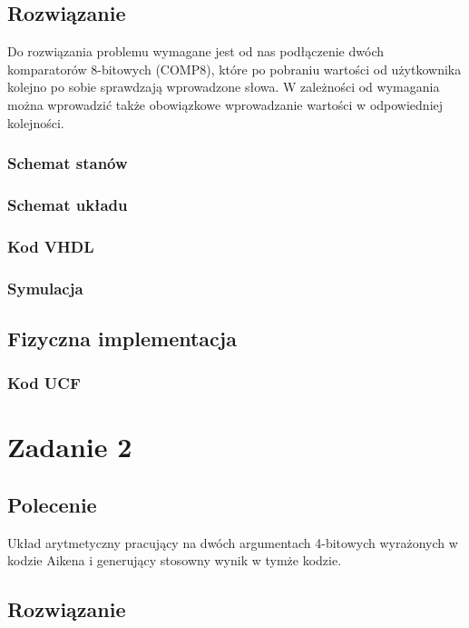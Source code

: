 \documentclass[a4paper,12pt]{extarticle}  %
\begin{document}
\subsection{Rozwiązanie}
Do rozwiązania problemu wymagane jest od nas podłączenie dwóch komparatorów 8-bitowych (COMP8), 
które po pobraniu wartości od użytkownika kolejno po sobie sprawdzają wprowadzone słowa.
W zależności od wymagania można wprowadzić także obowiązkowe wprowadzanie wartości w odpowiedniej kolejności.
\subsubsection{Schemat stanów}
\subsubsection{Schemat układu}
\subsubsection{Kod VHDL}
\subsubsection{Symulacja}
\subsection{Fizyczna implementacja}
\subsubsection{Kod UCF}

\section{Zadanie 2}
\subsection{Polecenie}
Układ arytmetyczny pracujący na dwóch argumentach 4-bitowych wyrażonych w kodzie Aikena
i generujący stosowny wynik w tymże kodzie. 
\subsection{Rozwiązanie}
\end{document}
